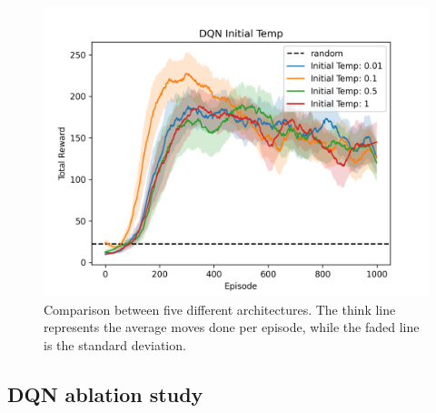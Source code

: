 \documentclass{article}
\begin{document}
   \begin{figure}[ht!]
      \centering
      \includegraphics[width=\columnwidth]{assets/fig_hp/temp.initial.png}
      \caption{Comparison between five different architectures. The think line represents the average moves done per episode, while the faded line is the standard deviation. 
      }
      \label{comp_temp}
   \end{figure}



\subsection{DQN ablation study}
\label{subsec:dqn-ablation-study}

\end{document}
